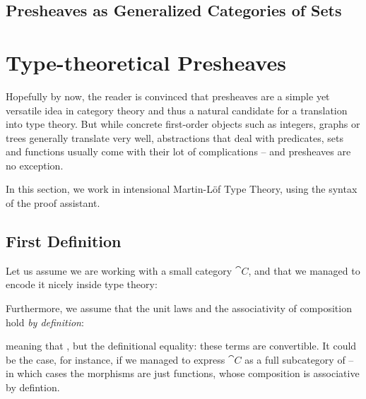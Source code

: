 
\subsection{Presheaves as Generalized Categories of Sets}




\section{Type-theoretical Presheaves}\label{sec:intensional-problems}

Hopefully by now, the reader is convinced that presheaves are a simple yet 
versatile idea in category theory and thus a natural candidate for a 
translation into type theory.
% 
But while concrete first-order objects such as integers, graphs or trees 
generally translate very well, abstractions that deal with predicates, sets
and functions usually come with their lot of complications -- and presheaves
are no exception.

In this section, we work in intensional Martin-Löf Type Theory, using the 
syntax of the \Agda proof assistant.

\subsection{First Definition}

Let us assume we are working with a small category \( \cat{C} \), and that we
managed to encode it nicely inside type theory:


Furthermore, we assume that the unit laws and the associativity of
composition hold \emph{by definition}:


% 
meaning that  ,
but the definitional equality: these terms are convertible. 
% 
It could be the case, for instance, if we managed to express \( \cat{C} \) as a 
full subcategory of  -- in which cases the morphisms are just 
functions, whose composition is associative by defintion.

